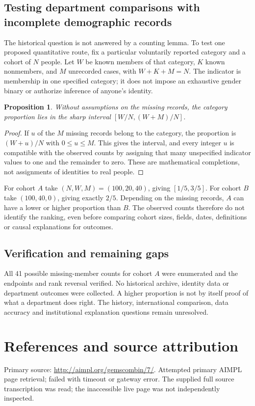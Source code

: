 \documentclass[11pt]{article}
\newtheorem{proposition}{Proposition}
\begin{document}
\subsection{Testing department comparisons with incomplete demographic records}
The historical question is not answered by a counting lemma. To test one proposed quantitative route, fix a particular voluntarily reported category and a cohort of $N$ people. Let $W$ be known members of that category, $K$ known nonmembers, and $M$ unrecorded cases, with $W+K+M=N$. The indicator is membership in one specified category; it does not impose an exhaustive gender binary or authorize inference of anyone's identity.
\begin{proposition}
Without assumptions on the missing records, the category proportion lies in the sharp interval $[W/N,(W+M)/N]$.
\end{proposition}
\begin{proof}
If $u$ of the $M$ missing records belong to the category, the proportion is $(W+u)/N$ with $0\le u\le M$. This gives the interval, and every integer $u$ is compatible with the observed counts by assigning that many unspecified indicator values to one and the remainder to zero. These are mathematical completions, not assignments of identities to real people.
\end{proof}
For cohort $A$ take $(N,W,M)=(100,20,40)$, giving $[1/5,3/5]$. For cohort $B$ take $(100,40,0)$, giving exactly $2/5$. Depending on the missing records, $A$ can have a lower or higher proportion than $B$. The observed counts therefore do not identify the ranking, even before comparing cohort sizes, fields, dates, definitions or causal explanations for outcomes.
\subsection{Verification and remaining gaps}
All 41 possible missing-member counts for cohort $A$ were enumerated and the endpoints and rank reversal verified. No historical archive, identity data or department outcomes were collected. A higher proportion is not by itself proof of what a department does right. The history, international comparison, data accuracy and institutional explanation questions remain unresolved.

\section{References and source attribution}
Primary source: \url{http://aimpl.org/gemscombin/7/}. Attempted primary AIMPL page retrieval; failed with timeout or gateway error. The supplied full source transcription was read; the inaccessible live page was not independently inspected.
\end{document}
